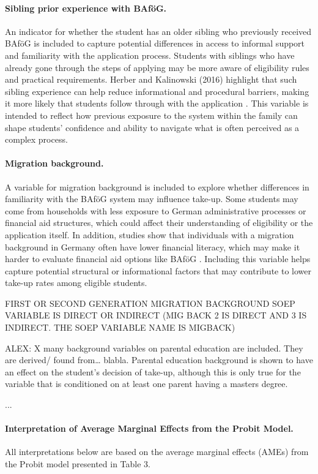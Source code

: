 \paragraph{Sibling prior experience with BAföG.} An indicator for whether the student has an older sibling who previously received BAföG is included to capture potential differences in access to informal support and familiarity with the application process. Students with siblings who have already gone through the steps of applying may be more aware of eligibility rules and practical requirements. Herber and Kalinowski (2016) highlight that such sibling experience can help reduce informational and procedural barriers, making it more likely that students follow through with the application \citep{herber_non-take-up_2019}. This variable is intended to reflect how previous exposure to the system within the family can shape students’ confidence and ability to navigate what is often perceived as a complex process.

\paragraph{Migration background.} A variable for migration background is included to explore whether differences in familiarity with the BAföG system may influence take-up. Some students may come from households with less exposure to German administrative processes or financial aid structures, which could affect their understanding of eligibility or the application itself. In addition, studies show that individuals with a migration background in Germany often have lower financial literacy, which may make it harder to evaluate financial aid options like BAföG \citep{Tsegay_2024}. Including this variable helps capture potential structural or informational factors that may contribute to lower take-up rates among eligible students. 

FIRST OR SECOND GENERATION MIGRATION BACKGROUND SOEP VARIABLE IS DIRECT OR INDIRECT (MIG BACK 2 IS DIRECT AND 3 IS INDIRECT. THE SOEP VARIABLE NAME IS MIGBACK)

ALEX: X many background variables on parental education are included. They are derived/ found from… blabla.
Parental education background is shown to have an effect on the student’s decision of take-up, although this is only true for the variable that is conditioned on at least one parent having a masters degree.

...

\paragraph{Interpretation of Average Marginal Effects from the Probit Model.} All interpretations below are based on the average marginal effects (AMEs) from the Probit model presented in Table 3.

